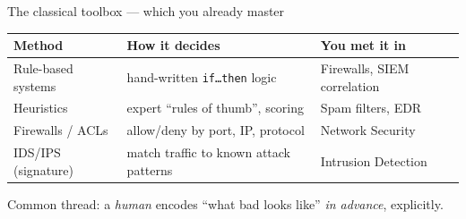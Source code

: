 \documentclass[aspectratio=169,10pt]{beamer}
\begin{document}
\begin{frame}{The classical toolbox --- which you already master}
  \small
  \renewcommand{\arraystretch}{1.3}
  \begin{tabular}{>{\raggedright\arraybackslash}p{3.0cm} >{\raggedright\arraybackslash}p{5.3cm} >{\raggedright\arraybackslash}p{3.4cm}}
    \toprule
    \textbf{Method} & \textbf{How it decides} & \textbf{You met it in}\\
    \midrule
    Rule-based systems      & hand-written \texttt{if\dots then} logic & Firewalls, SIEM correlation\\
    Heuristics              & expert ``rules of thumb'', scoring     & Spam filters, EDR\\
    Firewalls / ACLs        & allow/deny by port, IP, protocol       & Network Security\\
    IDS/IPS (signature)     & match traffic to known attack patterns & Intrusion Detection\\
    \bottomrule
  \end{tabular}
  \vfill
  {\footnotesize\color{midgray}Common thread: a \emph{human} encodes ``what bad
  looks like'' \emph{in advance}, explicitly.}
\end{frame}
\end{document}
